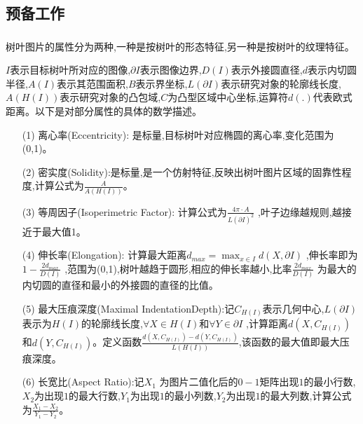 \documentclass{whutmod}
\begin{document}
		\subsection{预备工作}
		\subsubsection{}
		树叶图片的属性分为两种,一种是按树叶的形态特征,另一种是按树叶的纹理特征。
		
		$I$表示目标树叶所对应的图像,$\partial I$表示图像边界,$D(I)$表示外接圆直径,$d$表示内切圆半径,$A(I)$表示其范围面积,$B$表示界坐标,$L(\partial I)$表示研究对象的轮廓线长度,$A(H(I))$表示研究对象的凸包域,$C$为凸型区域中心坐标,运算符$d(.)$代表欧式距离。以下是对部分属性的具体的数学描述。
		
	\begin{itemize}	
		\item [(1)]离心率(Eccentricity): 是标量,目标树叶对应椭圆的离心率,变化范围为(0,1)。
		
		\item  [(2)]密实度(Solidity):是标量,是一个仿射特征,反映出树叶图片区域的固靠性程度,计算公式为$\frac{ A }{ A(H(I))}$。 
		
		\item [(3)]	等周因子(Isoperimetric Factor):
		计算公式为$\frac{4\pi \cdot  A}{L(\partial I)^{2}}$ ,叶子边缘越规则,越接近于最大值1。
		
		\item [(4)]伸长率(Elongation): 计算最大距离$d_{max}=\max _{x \in I} d(X,\partial I)$ ,伸长率即为 $1-\frac{2d_{max}}{D(I)}$ ,范围为(0,1),树叶越趋于圆形,相应的伸长率越小,比率$\frac{2d_{max}}{D(I)}$ 为最大的内切圆的直径和最小的外接圆的直径的比值。
		
		\item [(5)]最大压痕深度(Maximal IndentationDepth):记$C_{H(I)}$表示几何中心,$L(\partial I)$表示为$H(I)$的轮廓线长度,$\forall X\in H(I)$和$\forall Y\in \partial I$ ,计算距离$d(X,C_{H(I)})$ 和$d(Y,C_{H(I)})$。定义函数$\frac{ d(X,C_{H(I)})- d(Y,C_{H(I)})}{L(H(I))}$,该函数的最大值即最大压痕深度。
		
		\item [(6)]长宽比(Aspect Ratio):记$X_{1}$ 为图片二值化后的$0-1$矩阵出现$1$的最小行数,$X_{2}$为出现$1$的最大行数,$Y_{1}$为出现$1$的最小列数,$Y_{2}$为出现$1$的最大列数,计算公式为$\frac{X_{1}-X_{2}}{Y_{1}-Y_{2}}$。
	
	\end{itemize}	
\end{document}
